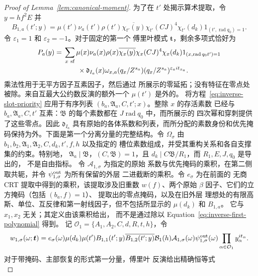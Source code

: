 \documentclass[11pt,a4paper]{article}
\numberwithin{equation}{section}
\numberwithin{figure}{section}
\theoremstyle{definition}
\theoremstyle{remark}
\begin{document}
\begin{proof}[Proof of Lemma~\ref{lem:canonical-moment}]
为了在 \(t'\) 处揭示算术提取，令 \(y=hf^2E\) 并
\[
 B_{1,a}(t';y)=\mu(t')\nu_a(t')\rho(t')\overline{\chi_{t'}(y)}
       \chi_{t'}(CJ)^4\chi_{t'}(d_k)1_{(t',\operatorname{rad}q_0)=1}.
\]
令 \(\varepsilon_1=1\) 和 \(\varepsilon_2=-1\)。对于固定的第一个
傅里叶模式 \(\boldsymbol t\)，剩余多项式恰好为
\begin{equation}\label{eq:inverse-first-polynomial}
 \begin{split}
 P_a(y)={}&\sum_{x\ {\rm sf}}\mu(x)\nu_a(x)\rho(x)
       \overline{\chi_x(y)}\chi_x(CJ)^4\chi_x(d_k)
       1_{(x,\operatorname{rad}q_0t')=1}\\
 &\qquad\times\mathfrak d_{I_a}(x)\omega_{x,a}(q_x/Z^{s_a})
                  (q_x/Z^{s_a})^{\varepsilon_a it_{x_a}}.
 \end{split}
\end{equation}
乘法性用于无平方因子互素因子，然后通过
所展示的零延拓；没有特征在零点处被除。来自互最大公约数反演的额外一个 \(\mu(t')\) 是外的。
将方程~\eqref{eq:inverse-slot-priority} 应用于有序列表
\((b_a,\mathfrak A_a,C,t';x)\)。整除 \(x\) 的存活素数
已经与 \(b_a,\mathfrak A_a,C,t'\) 互素：\(\mathfrak B\) 的每个素数都在 \(J\operatorname{rad}q_0\) 中，而所展示的
四次幂和穿刺提供了这些零点。因此
\(\mathfrak d_{I_a}\) 具有原始的各体系数和列表，而所分配的素数身份和优先掩码保持为外。下面是第一个分离分量的完整结构。令
\(\Omega_\sigma\) 由
\(b_1,b_2,\mathfrak A_1,\mathfrak A_2,C,d_k,t',f,h\) 以及指定的
槽位素数组成，并受其重构关系和各自支撑集的约束。特别地，
\(\mathfrak A_a\mid\mathfrak B\)，\((C,\mathfrak B)=1\)，且
\(d_k\mid C\mathfrak B/R_1\)，而 \(R_1,E,J,q_0\) 是导出的，
不是自由指标。
令 \(\mathcal A_{1,\sigma}\) 为指定的原始
系数与优先掩码的乘积，在第二侧取共轭，并令
\(\psi_{1,\sigma}^{\rm out}\) 为所有保留的外层
二进截断的乘积。令 \(e_\sigma\) 为在前面的
无商 CRT 提取中得到的乘积，该提取涉及旧重数 \(w(f)\)、两个原始
\(\beta\) 因子、它们的立方掩码（包括 \((b_a,f)=1\)）、
提取出的零点掩码，以及在旧外层
理想处的有限高斯、单位、互反律和第一射线因子，但不包括所显示的 \(\mu(d_k)\) 和 \(B_{1,a}\)。
它与 \(x_1,x_2\) 无关；其定义由该乘积给出，
而不是通过除以 Equation~\eqref{eq:inverse-first-polynomial} 得到。
记 \(\mathcal O_1=\{A_1,A_2,C,d,R,t,h\}\)，令
\[
 w_{1,\sigma}(\omega;\boldsymbol t)
 =e_\sigma(\omega)\mu(d_k)\mu(t')B_{1,1}(t';y)
       \overline{B_{1,2}(t';y)}\mathcal B_1(h)
       \mathcal A_{1,\sigma}(\omega)\psi_{1,\sigma}^{\rm out}(\omega)
       \prod_{\alpha\in\mathcal O_1}y_\alpha^{it_\alpha}.
\]
对于带掩码、主部恢复的形式第一分量，傅里叶
反演给出精确恒等式
\begin{equation}\label{eq:inverse-first-separated}

\end{equation}
\end{proof}
\end{document}
